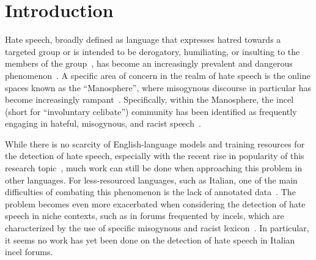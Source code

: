 \documentclass[11pt]{article}
\begin{document}
\section{Introduction}

Hate speech, broadly defined as language that expresses hatred towards a targeted group or is intended to be derogatory, humiliating, or insulting to the members of the group~\cite{davidson-2017-automated-hate}, has become an increasingly prevalent and dangerous phenomenon~\cite{matamoros-fernandezRacismHateSpeech2021}.
 A specific area of concern in the realm of hate speech is the online spaces known as the ``Manosphere'', where misogynous discourse in particular has become increasingly rampant~\cite{ribeiro2021evolution-manosphere}.
Specifically, within the Manosphere, the incel (short for ``involuntary celibate'') community has been identified as frequently engaging in hateful, misogynous, and racist speech~\cite{nagle-2017-kill-normies,jakiOnlineHatredWomen2019}.

While there is no scarcity of English-language models and training resources for
the detection of hate speech, especially with the recent rise in popularity of
this research topic~\cite{alkomahLiteratureReviewTextual2022},
much work can still be done when approaching this problem in other languages.
For less-resourced languages, such as Italian, one of the main difficulties of combating this phenomenon is the lack of annotated data~\cite{van2023mitigating}. The problem becomes even more
exacerbated when considering the detection of hate speech in niche contexts,
such as in forums frequented by incels, which are characterized by the use of
specific misogynous and racist lexicon~\cite{gothard2020ExploringIncelLanguage}. In particular, it seems no work has yet been done on the detection of hate speech in Italian incel forums.
\end{document}
